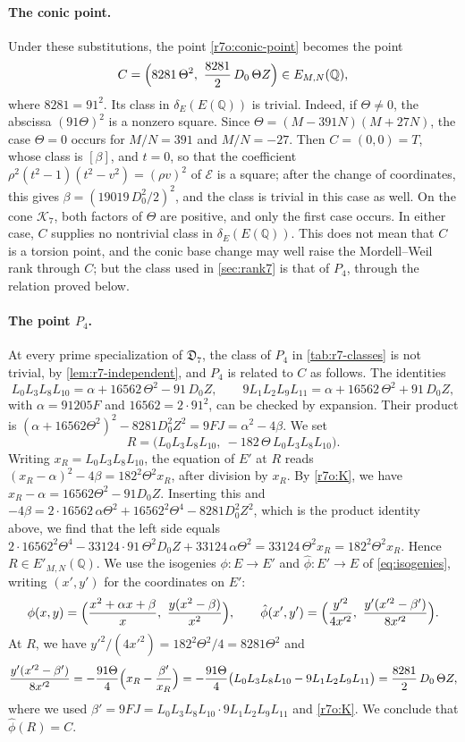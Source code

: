 \documentclass[12pt,oneside,openany]{book}
\theoremstyle{definition}
\theoremstyle{plain}
\numberwithin{equation}{chapter}
\theoremstyle{plain}
\theoremstyle{definition}
\theoremstyle{remark}
\newcommand{\Q}{\mathbb Q}
\newcommand{\sq}[1]{[#1]}
\newcommand{\dual}{\hat\phi}
\newcommand{\datum}{\mathfrak D}
\newcommand{\cK}{\mathcal K}
\begin{document}
\paragraph{The conic point.} Under these substitutions, the point
\eqref{r7o:conic-point} becomes the point
\[
 C=\Bigl(8281\,\Theta^2,\ \frac{8281}2\,D_0\,\Theta Z\Bigr)\in E_{M,N}(\Q),
\]
where $8281=91^2$. Its class in $\delta_E(E(\Q))$ is trivial. Indeed, if
$\Theta\ne0$, the abscissa $(91\Theta)^2$ is a nonzero square. Since
$\Theta=(M-391N)(M+27N)$, the case $\Theta=0$ occurs for $M/N=391$ and
$M/N=-27$. Then $C=(0,0)=T$, whose class is $\sq\beta$, and $t=0$, so that
the coefficient $\rho^2(t^2-1)(t^2-v^2)=(\rho v)^2$ of $\mathcal E$ is a
square; after the change of coordinates, this gives
$\beta=(19019\,D_0^2/2)^2$, and the class is trivial in this case as well. On
the cone $\cK_7$, both factors of $\Theta$ are positive, and only the first
case occurs. In either case, $C$ supplies no nontrivial class in $\delta_E(E(\Q))$.
This does not mean that $C$ is a torsion point, and the conic base change
may well raise the Mordell--Weil rank through $C$; but the class used in
\cref{sec:rank7} is that of $P_4$, through the relation proved below.

\paragraph{The point $P_4$.} At every prime specialization of $\datum_7$, the
class of $P_4$ in \cref{tab:r7-classes} is not trivial, by
\cref{lem:r7-independent}, and $P_4$ is related to $C$ as follows. The identities
\begin{equation}\label{r7o:K}
 L_0L_3L_8L_{10}=\alpha+16562\,\Theta^2-91\,D_0Z,\qquad
 9L_1L_2L_9L_{11}=\alpha+16562\,\Theta^2+91\,D_0Z,
\end{equation}
with $\alpha=91205F$ and $16562=2\cdot91^2$, can be checked by expansion.
Their product is
$(\alpha+16562\Theta^2)^2-8281D_0^2Z^2=9FJ=\alpha^2-4\beta$. We set
\[
 R=\bigl(L_0L_3L_8L_{10},\ -182\,\Theta\,L_0L_3L_8L_{10}\bigr).
\]
Writing $x_R=L_0L_3L_8L_{10}$, the equation of $E'$ at $R$ reads
$(x_R-\alpha)^2-4\beta=182^2\Theta^2x_R$, after division by $x_R$. By
\eqref{r7o:K}, we have $x_R-\alpha=16562\Theta^2-91D_0Z$. Inserting this and
$-4\beta=2\cdot16562\,\alpha\Theta^2+16562^2\Theta^4-8281D_0^2Z^2$, which is
the product identity above, we find that the left side equals
$2\cdot16562^2\Theta^4-33124\cdot91\,\Theta^2D_0Z+33124\,\alpha\Theta^2
=33124\,\Theta^2x_R=182^2\Theta^2x_R$. Hence $R\in E'_{M,N}(\Q)$. We use the isogenies
$\phi\colon E\to E'$ and $\dual\colon E'\to E$ of \eqref{eq:isogenies},
writing $(x',y')$ for the coordinates on $E'$:
\[
 \phi(x,y)=\Bigl(\frac{x^2+\alpha x+\beta}x,\ \frac{y(x^2-\beta)}{x^2}\Bigr),
 \qquad
 \dual(x',y')=\Bigl(\frac{y'^2}{4x'^2},\ \frac{y'(x'^2-\beta')}{8x'^2}\Bigr).
\]
At $R$, we have $y'^2/(4x'^2)=182^2\Theta^2/4=8281\Theta^2$ and
\[
 \frac{y'(x'^2-\beta')}{8x'^2}=-\frac{91\Theta}4\Bigl(x_R-\frac{\beta'}{x_R}\Bigr)
 =-\frac{91\Theta}4\bigl(L_0L_3L_8L_{10}-9L_1L_2L_9L_{11}\bigr)
 =\frac{8281}2\,D_0\,\Theta Z,
\]
where we used $\beta'=9FJ=L_0L_3L_8L_{10}\cdot9L_1L_2L_9L_{11}$ and
\eqref{r7o:K}. We conclude that $\dual(R)=C$.
\end{document}
